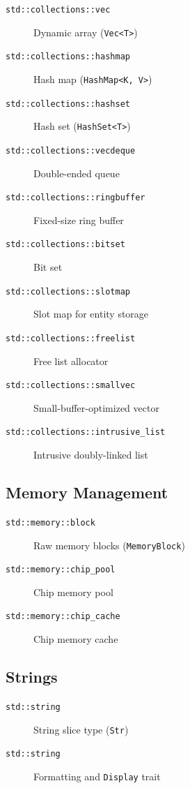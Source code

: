 \begin{description}
    \item[\texttt{std::collections::vec}] Dynamic array (\texttt{Vec<T>})
    \item[\texttt{std::collections::hashmap}] Hash map (\texttt{HashMap<K, V>})
    \item[\texttt{std::collections::hashset}] Hash set (\texttt{HashSet<T>})
    \item[\texttt{std::collections::vecdeque}] Double-ended queue
    \item[\texttt{std::collections::ringbuffer}] Fixed-size ring buffer
    \item[\texttt{std::collections::bitset}] Bit set
    \item[\texttt{std::collections::slotmap}] Slot map for entity storage
    \item[\texttt{std::collections::freelist}] Free list allocator
    \item[\texttt{std::collections::smallvec}] Small-buffer-optimized vector
    \item[\texttt{std::collections::intrusive\_list}] Intrusive doubly-linked list
\end{description}

\subsection{Memory Management}
\label{subsec:memory-modules}

\begin{description}
    \item[\texttt{std::memory::block}] Raw memory blocks (\texttt{MemoryBlock})
    \item[\texttt{std::memory::chip\_pool}] Chip memory pool
    \item[\texttt{std::memory::chip\_cache}] Chip memory cache
\end{description}

\subsection{Strings}
\label{subsec:string-modules}

\begin{description}
    \item[\texttt{std::string}] String slice type (\texttt{Str})
    \item[\texttt{std::string}] Formatting and \texttt{Display} trait
\end{description}

